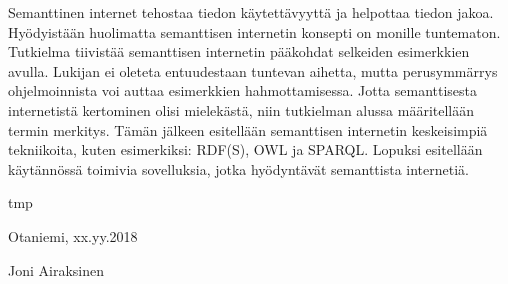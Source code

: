 \documentclass[finnish, 12pt, a4paper, elec, utf8, pdfa, online]{aaltothesis}
\date{24.4.2018}
\begin{document}
\makecoverpage

\makecopyrightpage

\begin{abstractpage}[finnish]
Semanttinen internet tehostaa tiedon käytettävyyttä ja helpottaa tiedon jakoa. Hyödyistään huolimatta semanttisen internetin konsepti on monille tuntematon. Tutkielma tiivistää semanttisen internetin pääkohdat selkeiden esimerkkien avulla. Lukijan ei oleteta entuudestaan tuntevan aihetta, mutta perusymmärrys ohjelmoinnista voi auttaa esimerkkien hahmottamisessa. Jotta semanttisesta internetistä kertominen olisi mielekästä, niin tutkielman alussa määritellään termin merkitys. Tämän jälkeen esitellään semanttisen internetin keskeisimpiä tekniikoita, kuten esimerkiksi: RDF(S), OWL ja SPARQL. Lopuksi esitellään käytännössä toimivia sovelluksia, jotka hyödyntävät semanttista internetiä.
\end{abstractpage}


\newpage





tmp

\vspace{5cm}
Otaniemi, xx.yy.2018

\vspace{5mm}
{\hfill Joni Airaksinen \hspace{1cm}}

\newpage
\end{document}
